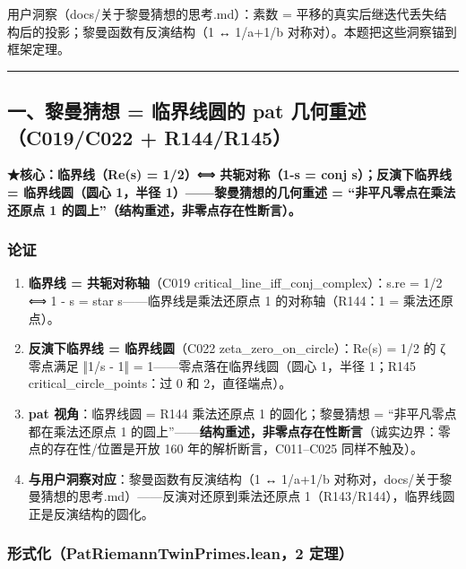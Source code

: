 \documentclass[
]{article}
\providecommand{\tightlist}{%
 \setlength{\itemsep}{0pt}\setlength{\parskip}{0pt}}
\begin{document}
用户洞察（docs/关于黎曼猜想的思考.md）：素数 =
平移的真实后继迭代丢失结构后的投影；黎曼函数有反演结构（1 ↔ 1/a+1/b
对称对）。本题把这些洞察锚到框架定理。

\begin{center}\rule{0.5\linewidth}{0.5pt}\end{center}

\subsection{一、黎曼猜想 = 临界线圆的 pat 几何重述（C019/C022 +
R144/R145）}\label{ux4e00ux9eceux66fcux731cux60f3-ux4e34ux754cux7ebfux5706ux7684-pat-ux51e0ux4f55ux91cdux8ff0c019c022-r144r145}

\textbf{★核心：临界线（Re(s) = 1/2）⟺ 共轭对称（1-s = conj
s）；反演下临界线 = 临界线圆（圆心 1，半径 1）------黎曼猜想的几何重述 =
``非平凡零点在乘法还原点 1 的圆上''（结构重述，非零点存在性断言）。}

\subsubsection{论证}\label{ux8bbaux8bc1}

\begin{enumerate}
\def\labelenumi{\arabic{enumi}.}
\tightlist
\item
 \textbf{临界线 = 共轭对称轴}（C019
 critical\_line\_iff\_conj\_complex）：s.re = 1/2 ⟺ 1 - s = star
 s------临界线是乘法还原点 1 的对称轴（R144：1 = 乘法还原点）。
\item
 \textbf{反演下临界线 = 临界线圆}（C022 zeta\_zero\_on\_circle）：Re(s)
 = 1/2 的 ζ 零点满足 ‖1/s - 1‖ = 1------零点落在临界线圆（圆心 1，半径
 1；R145 critical\_circle\_points：过 0 和 2，直径端点）。
\item
 \textbf{pat 视角}：临界线圆 = R144 乘法还原点 1 的圆化；黎曼猜想 =
 ``非平凡零点都在乘法还原点 1
 的圆上''------\textbf{结构重述，非零点存在性断言}（诚实边界：零点的存在性/位置是开放
 160 年的解析断言，C011--C025 同样不触及）。
\item
 \textbf{与用户洞察对应}：黎曼函数有反演结构（1 ↔ 1/a+1/b
 对称对，docs/关于黎曼猜想的思考.md）------反演对还原到乘法还原点
 1（R143/R144），临界线圆正是反演结构的圆化。
\end{enumerate}

\subsubsection{形式化（PatRiemannTwinPrimes.lean，2
定理）}\label{ux5f62ux5f0fux5316patriemanntwinprimes.lean2-ux5b9aux7406}
\end{document}
